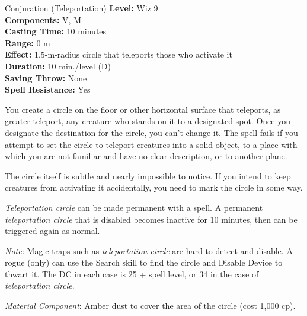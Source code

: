 {Conjuration (Teleportation)}
{
	\textbf{Level:}
	Wiz 9\\
	\textbf{Components:}
	V, M\\
	\textbf{Casting Time:}
	10 minutes\\
	\textbf{Range:}
	0 m\\
	\textbf{Effect:}
	1.5-m-radius circle that teleports those who activate it\\
	\textbf{Duration:}
	10 min./level (D)\\
	\textbf{Saving Throw:}
	None\\
	\textbf{Spell Resistance:}
	Yes\\
}
{
	You create a circle on the floor or other horizontal surface that teleports, as greater teleport, any creature who stands on it to a designated spot. Once you designate the destination for the circle, you can't change it. The spell fails if you attempt to set the circle to teleport creatures into a solid object, to a place with which you are not familiar and have no clear description, or to another plane.

	The circle itself is subtle and nearly impossible to notice. If you intend to keep creatures from activating it accidentally, you need to mark the circle in some way.

	\emph{Teleportation circle} can be made permanent with a  spell. A permanent \emph{teleportation circle} that is disabled becomes inactive for 10 minutes, then can be triggered again as normal.

	\textit{Note:}
	Magic traps such as \emph{teleportation circle} are hard to detect and disable. A rogue (only) can use the Search skill to find the circle and Disable Device to thwart it. The DC in each case is 25 + spell level, or 34 in the case of \emph{teleportation circle}.

	\textit{Material Component}:
	Amber dust to cover the area of the circle (cost 1,000 cp).

}
